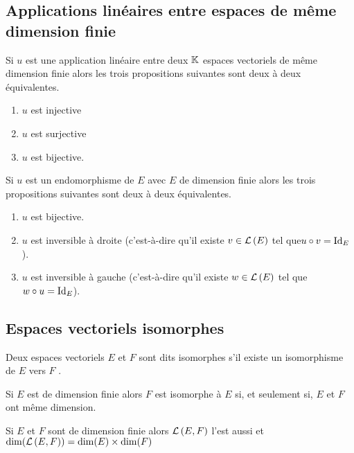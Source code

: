 \subsection{Applications linéaires entre espaces de même dimension finie}
\begin{defprop}    
    Si \(u\) est une application linéaire entre deux \(\mathbb{K}\) espaces vectoriels de même dimension finie alors les trois propositions suivantes sont deux à deux équivalentes.
    \begin{enumerate}
        \item \(u\) est injective
        \item \(u\) est surjective
        \item \(u\) est bijective.
    \end{enumerate}
\end{defprop}

\begin{defprop}
    
    Si \(u\) est un endomorphisme de \(E\) avec \(E\) de dimension finie alors les trois propositions suivantes sont deux à deux équivalentes.
    \begin{enumerate}
        \item \(u\) est bijective.
        \item \(u\) est inversible à droite (c’est-à-dire qu’il existe \(v \in  \mathcal{L}\left(E\right)\) tel que\( u \circ v = \mathrm{Id}_{E}\)).
        \item \(u\) est inversible à gauche (c’est-à-dire qu’il existe \(w \in  \mathcal{L}\left(E\right)\) tel que \(w \circ u = \mathrm{Id}_{E}\)).
    \end{enumerate}
\end{defprop}

\subsection{Espaces vectoriels isomorphes}
\begin{defi}
    Deux espaces vectoriels \(E\) et \(F\) sont dits isomorphes s’il existe un isomorphisme de \(E\) vers \(F\) .
\end{defi}

\begin{defprop}
    Si \(E\) est de dimension finie alors \(F\) est isomorphe à \(E\) si, et seulement si, \(E\) et \(F\) ont même dimension.
\end{defprop}
\begin{defprop}
    Si \(E\) et \(F\) sont de dimension finie alors \(\mathcal{L}\left(E,F\right)\) l’est aussi et\( \dim (\mathcal{L}\left(E,F\right)) = \dim(E) \times \dim(F )\)
\end{defprop}
